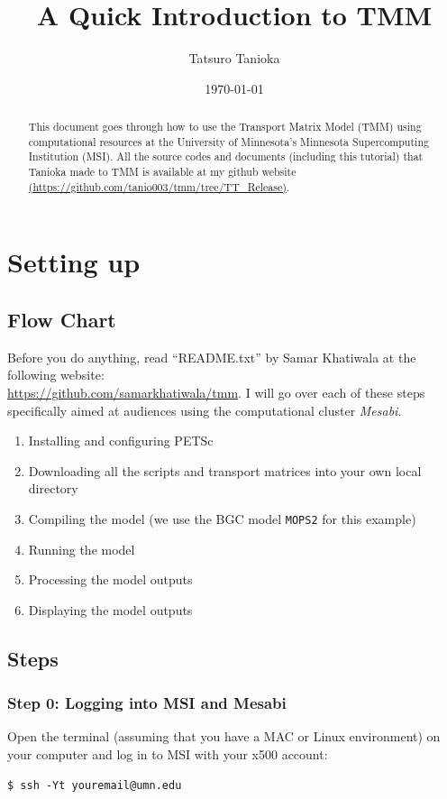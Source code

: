 \documentclass[a4paper]{article}
\title{A Quick Introduction to TMM}
\author{Tatsuro Tanioka}
\date{\today}
\def\noin{\noindent }
\begin{document}
\maketitle

\begin{abstract}
This document goes through how to use the Transport Matrix Model (TMM) using computational resources at the University of Minnesota's Minnesota Supercomputing Institution (MSI). All the source codes and documents (including this tutorial) that Tanioka made to TMM is available at my github website \url{(https://github.com/tanio003/tmm/tree/TT_Release)}.
\end{abstract}

\tableofcontents

\section{Setting up}

\subsection{Flow Chart}
Before you do anything, read ``README.txt'' by Samar Khatiwala at the following website: \\ \url{https://github.com/samarkhatiwala/tmm}. I will go over each of these steps specifically aimed at audiences using the computational cluster \emph{Mesabi}.
\begin{enumerate}
\item Installing and configuring PETSc
\item Downloading all the scripts and transport matrices into your own local directory
\item Compiling the model (we use the BGC model \verb/MOPS2/ for this example)
\item Running the model
\item Processing the model outputs
\item Displaying the model outputs
\end{enumerate}

\subsection{Steps}

\subsubsection{Step 0: Logging into MSI and Mesabi}
\noin Open the terminal (assuming that you have a MAC or Linux environment) on your computer and log in to MSI with your x500 account:
\begin{lstlisting}[style=DOS]
 $ ssh -Yt youremail@umn.edu
\end{lstlisting}
\end{document}

